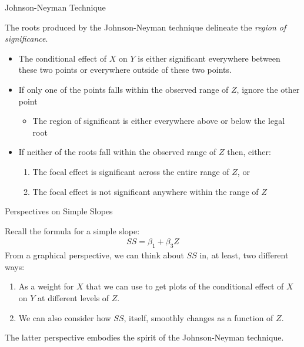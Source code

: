 \documentclass{beamer}
\newcommand{\va}[0]{\vspace{12pt}}
\newcommand{\vb}[0]{\vspace{6pt}}
\newcommand{\vc}[0]{\vspace{3pt}}
\begin{document}
\begin{frame}{Johnson-Neyman Technique}
  
  The roots produced by the Johnson-Neyman technique delineate the
  \emph{region of significance}.  
  \vb
  \begin{itemize}
  \item The conditional effect of $X$ on $Y$ is either significant
    everywhere between these two points or everywhere outside of these
    two points.  
    \vb
  \item If only one of the points falls within the observed range of
    $Z$, ignore the other point 
    \vc
    \begin{itemize}
    \item The region of significant is either everywhere above or
      below the legal root
    \end{itemize}
    \vb
  \item If neither of the roots fall within the observed range of $Z$
    then, either: 
    \vc
    \begin{enumerate}
    \item The focal effect is significant across the entire range of
      $Z$, or 
      \vc
    \item The focal effect is not significant anywhere within the
      range of $Z$
    \end{enumerate}
  \end{itemize}
  
\end{frame}


\begin{frame}{Perspectives on Simple Slopes}
  
  Recall the formula for a simple slope:
  \begin{align*}
    SS = \beta_1 + \beta_3Z
  \end{align*}
  \vc From a graphical perspective, we can think about $SS$ in, at
  least, two different ways:
  \vb
  \begin{enumerate}
  \item As a weight for $X$ that we can use to get plots of the
    conditional effect of $X$ on $Y$ at different levels of $Z$.
    \vb
  \item We can also consider how $SS$, itself, smoothly changes as a
    function of $Z$.  
  \end{enumerate}
  \va
  The latter perspective embodies the spirit of the Johnson-Neyman
  technique.
  
\end{frame}
\end{document}
